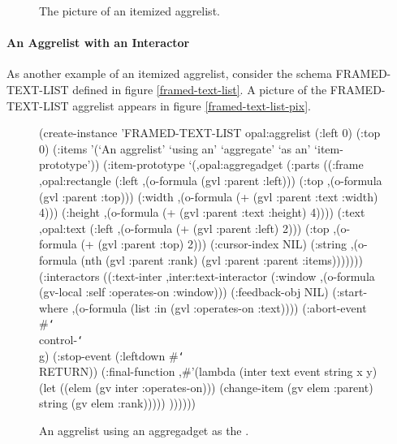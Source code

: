 \begin{figure}
\begin{center}
\end{center}
\caption{The picture of an itemized aggrelist.}
\end{figure}


\paragraph{An Aggrelist with an Interactor}
As another example of an itemized aggrelist, consider the schema
FRAMED-TEXT-LIST defined in figure \ref{framed-text-list}.
A picture of the FRAMED-TEXT-LIST aggrelist appears in figure
\ref{framed-text-list-pix}.

\begin{figure}
\begin{programexample}
(create-instance 'FRAMED-TEXT-LIST opal:aggrelist
   (:left 0) (:top 0)
   (:items '(`An aggrelist' `using an' `aggregate'
	     `as an' `item-prototype'))
   (:item-prototype
    `(,opal:aggregadget
      (:parts
       ((:frame ,opal:rectangle
	   (:left ,(o-formula (gvl :parent :left)))
	   (:top ,(o-formula (gvl :parent :top)))
	   (:width ,(o-formula (+ (gvl :parent :text :width) 4)))
	   (:height ,(o-formula (+ (gvl :parent :text :height) 4))))
	(:text ,opal:text
	   (:left ,(o-formula (+ (gvl :parent :left) 2)))
	   (:top ,(o-formula (+ (gvl :parent :top) 2)))
	   (:cursor-index NIL)
	   (:string ,(o-formula
		      (nth (gvl :parent :rank)
		      (gvl :parent :parent :items)))))))
      (:interactors
       ((:text-inter ,inter:text-interactor
	   (:window ,(o-formula
		      (gv-local :self :operates-on :window)))
	   (:feedback-obj NIL)
	   (:start-where ,(o-formula
	     (list :in (gvl :operates-on :text))))
	   (:abort-event \#{\tt\char`\\}control-{\tt\char`\\}g)
	   (:stop-event (:leftdown \#{\tt\char`\\}RETURN))
	   (:final-function
	    ,\#'(lambda (inter text event string x y)
		 (let ((elem (gv inter :operates-on)))
		   (change-item (gv elem :parent)
				string
				(gv elem :rank))))) ))))))
\end{programexample}
\caption{An aggrelist using an aggregadget as the .}
\end{figure}

